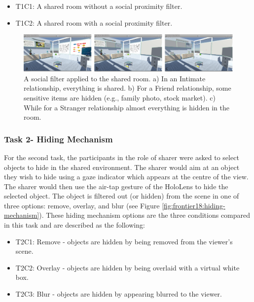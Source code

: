 \begin{itemize}
\item T1C1: A shared room without a social proximity filter.
\item T1C2: A shared room with a social proximity filter. 
\end{itemize}

\begin{figure}
    \begin{center}
    \includegraphics[width=\linewidth]{images/54-hiding-frontier18/images-02.png}
    \caption{A social filter applied to the shared room. a) In an Intimate relationship, everything is shared. b) For a Friend relationship, some sensitive items are hidden (e.g., family photo, stock market). c) While for a Stranger relationship almost everything is hidden in the room.}
    \label{fig:frontier18:social-filter}
    \end{center}
\end{figure}

\subsubsection{Task 2- Hiding Mechanism}

For the second task, the participants in the role of sharer were asked to select objects to hide in the shared environment. The sharer would aim at an object they wish to hide using a gaze indicator which appears at the centre of the view. The sharer would then use the air-tap gesture of the HoloLens to hide the selected object. The object is filtered out (or hidden) from the scene in one of three options: remove, overlay, and blur (see Figure \ref{fig:frontier18:hiding-mechanism}). These hiding mechanism options are the three conditions compared in this task and are described as the following:

\begin{itemize}
\item T2C1: Remove - objects are hidden by being removed from the viewer's scene.
\item T2C2: Overlay - objects are hidden by being overlaid with a virtual white box. 
\item T2C3: Blur - objects are hidden by appearing blurred to the viewer. 
\end{itemize}

